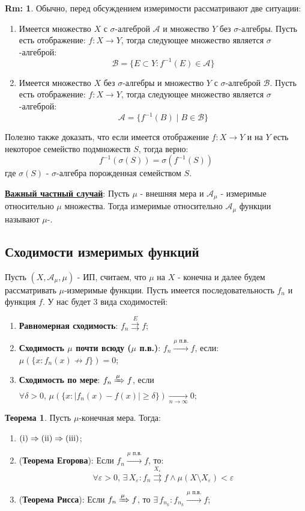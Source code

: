 \documentclass[12pt]{article}
\newcommand{\RN}[1]{%
	\textup{\uppercase\expandafter{\romannumeral#1}}%
}
\newcommand{\MA}{\mathcal{A}}
\newcommand{\MB}{\mathcal{B}}
\newcommand{\VE}{\varepsilon}
\theoremstyle{definition}
\newtheorem{rem}{Rm:}
\newtheorem{theorem}{Теорема}
\newcommand{\uconv}[1]{\overset{#1}{\rightrightarrows}}
\begin{document}
\begin{rem}
	Обычно, перед обсуждением измеримости рассматривают две ситуации:
	\begin{enumerate}[label = (\arabic*)]
		\item Имеется множество $X$ с $\sigma$-алгеброй $\MA$ и множество $Y$ без $\sigma$-алгебры. Пусть есть отображение: $f\colon X \to Y$, тогда следующее множество является $\sigma$-алгеброй:
		$$
		\MB = \{E \subset Y \colon f^{-1}(E) \in \MA\}
		$$
		\item Имеется множество $X$ без $\sigma$-алгебры и множество $Y$ с $\sigma$-алгеброй $\MB$. Пусть есть отображение: $f\colon X \to Y$, тогда следующее множество является $\sigma$-алгеброй:
		$$
		\MA = \{f^{-1}(B) \mid B \in \MB \}
		$$
	\end{enumerate}
	Полезно также доказать, что если имеется отображение $f\colon X \to Y$ и на $Y$ есть некоторое семейство подмножеств $S$, тогда верно:
	$$
	f^{-1}(\sigma(S)) = \sigma(f^{-1}(S))
	$$
	где $\sigma(S)$ - $\sigma$-алгебра порожденная семейством $S$.
\end{rem}

\uline{\textbf{Важный частный случай}}: Пусть $\mu$ - внешняя мера и $\MA_\mu$ - измеримые относительно $\mu$ множества. Тогда измеримые относительно $\MA_\mu$ функции называют $\mu$-.

\subsection*{Сходимости измеримых функций}
Пусть $(X,\MA_\mu, \mu)$ - ИП, считаем, что $\mu$ на $X$ - конечна и далее будем рассматривать $\mu$-измеримые функции. Пусть имеется последовательность $f_n$ и функция $f$. У нас будет $3$ вида сходимостей:
\begin{enumerate}[label = (\Roman*)]
	\item \textbf{Равномерная сходимость}: $f_n \uconv{E} f$;
	\item \textbf{Сходимость $\mu$ почти всюду ($\mu$ п.в.)}: $f_n \xrightarrow{\mu \text{ п.в.}} f$, если: $\mu\left(\{x \colon f_n(x) \nrightarrow f\}\right) = 0$;
	\item \textbf{Сходимость по мере}: $f_n \xRightarrow{\mu} f$, если $\forall \delta > 0, \, \mu\left(\{x \colon |f_n(x) - f(x)| \geq \delta\}\right) \xrightarrow[n\to\infty]{} 0$;
\end{enumerate}

\begin{theorem}
	Пусть $\mu$-конечная мера. Тогда:
	\begin{enumerate}[label=\arabic*)]
		\item $(\RN{1}) \Rightarrow (\RN{2}) \Rightarrow (\RN{3})$;
		\item (\textbf{Теорема Егорова}): Если $f_n \xrightarrow{\mu \text{ п.в.}} f$, то:
		$$
		\forall \VE > 0,\, \exists \, X_\VE \colon f_n \uconv{X_\VE} f \wedge \mu(X \setminus X_\VE) < \VE
		$$
		\item (\textbf{Теорема Рисса}): Если $f_n \xRightarrow{\mu} f$, то $\exists \, f_{n_k} \colon f_{n_k} \xrightarrow{\mu \text{ п.в.}} f$;
	\end{enumerate}
\end{theorem}
\end{document}

